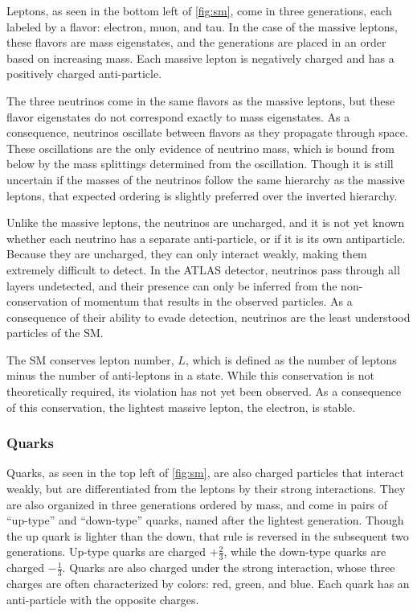 Leptons, as seen in the bottom left of \autoref{fig:sm}, come in three generations, each labeled by a flavor: electron, muon, and tau. In the case of the massive leptons, these flavors are mass eigenstates, and the generations are placed in an order based on increasing mass. Each massive lepton is negatively charged and has a positively charged anti-particle. 

The three neutrinos come in the same flavors as the massive leptons, but these flavor eigenstates do not correspond exactly to mass eigenstates. As a consequence, neutrinos oscillate between flavors as they propagate through space. These oscillations are the only evidence of neutrino mass, which is bound from below by the mass splittings determined from the oscillation. Though it is still uncertain if the masses of the neutrinos follow the same hierarchy as the massive leptons, that expected ordering is slightly preferred over the inverted hierarchy. \cite{Huang:2016} 

Unlike the massive leptons, the neutrinos are uncharged, and it is not yet known whether each neutrino has a separate anti-particle, or if it is its own antiparticle. Because they are uncharged, they can only interact weakly, making them extremely difficult to detect. In the ATLAS detector, neutrinos pass through all layers undetected, and their presence can only be inferred from the non-conservation of momentum that results in the observed particles. As a consequence of their ability to evade detection, neutrinos are the least understood particles of the \ac{SM}. 

The \ac{SM} conserves lepton number, $L$, which is defined as the number of leptons minus the number of anti-leptons in a state. While this conservation is not theoretically required, its violation has not yet been observed. As a consequence of this conservation, the lightest massive lepton, the electron, is stable.

\subsubsection{Quarks}
\label{sec:quarks}

Quarks, as seen in the top left of \autoref{fig:sm}, are also charged particles that interact weakly, but are differentiated from the leptons by their strong interactions. They are also organized in three generations ordered by mass, and come in pairs of ``up-type'' and ``down-type'' quarks, named after the lightest generation. Though the up quark is lighter than the down, that rule is reversed in the subsequent two generations. Up-type quarks are charged $+\frac{2}{3}$, while the down-type quarks are charged $-\frac{1}{3}$. Quarks are also charged under the strong interaction, whose three charges are often characterized by colors: red, green, and blue. Each quark has an anti-particle with the opposite charges. 

